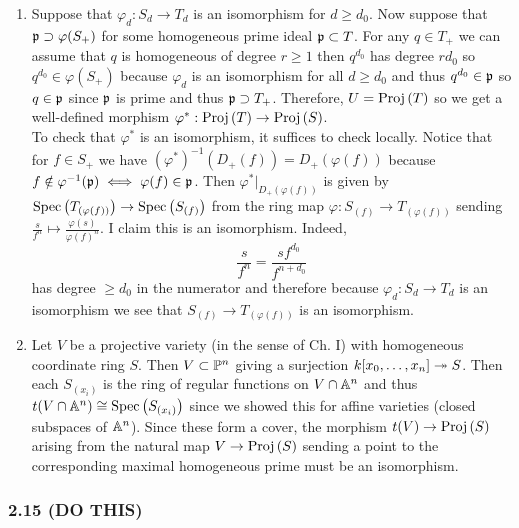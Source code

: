 \documentclass[12pt]{article}
\begin{document}
\begin{enumerate}
\item Suppose that $\varphi_d : S_d \to T_d$ is an isomorphism for $d \ge d_0$. Now suppose that $\p \supset \varphi(S_+)$ for some homogeneous prime ideal $\p \subset T$. For any $q \in T_+$ we can assume that $q$ is homogeneous of degree $r \ge 1$ then $q^{d_0}$ has degree $rd_0$ so $q^{d_0} \in \varphi(S_+)$ because $\varphi_d$ is an isomorphism for all $d \ge d_0$ and thus $q^{d_0} \in \p$ so $q \in \p$ since $\p$ is prime and thus $\p \supset T_+$. Therefore, $U = \Proj{T}$ so we get a well-defined morphism $\varphi^* : \Proj{T} \to \Proj{S}$.
\bigskip\\
To check that $\varphi^*$ is an isomorphism, it suffices to check locally. Notice that for $f \in S_+$ we have $(\varphi^*)^{-1}(D_+(f)) = D_+(\varphi(f))$ because $f \notin \varphi^{-1}(\p) \iff \varphi(f) \in \p$. Then $\varphi^* |_{D_+(\varphi(f))}$ is given by $\Spec{T_{(\varphi(f))}} \to \Spec{S_{(f)}}$ from the ring map $\varphi : S_{(f)} \to T_{(\varphi(f))}$ sending $\frac{s}{f^n} \mapsto \frac{\varphi(s)}{\varphi(f)^n}$. I claim this is an isomorphism. Indeed, 
\[ \frac{s}{f^n} = \frac{s f^{d_0}}{f^{n + d_0}} \]
has degree $\ge d_0$ in the numerator and therefore because $\varphi_d : S_d \to T_d$ is an isomorphism we see that $S_{(f)} \to T_{(\varphi(f))}$ is an isomorphism.

\item Let $V$ be a projective variety (in the sense of Ch. I) with homogeneous coordinate ring $S$. Then $V \subset \P^n$ giving a surjection $k[x_0, \dots, x_n] \onto S$. Then each $S_{(x_i)}$ is the ring of regular functions on $V \cap \A^n$ and thus $t(V \cap \A^n) \cong \Spec{S_{(x_i)}}$ since we showed this for affine varieties (closed subspaces of $\A^n$). Since these form a cover, the morphism $t(V) \to \Proj{S}$ arising from the natural map $V \to \Proj{S}$ sending a point to the corresponding maximal homogeneous prime must be an isomorphism.
\end{enumerate}

\subsubsection{2.15 (DO THIS)}
\end{document}

